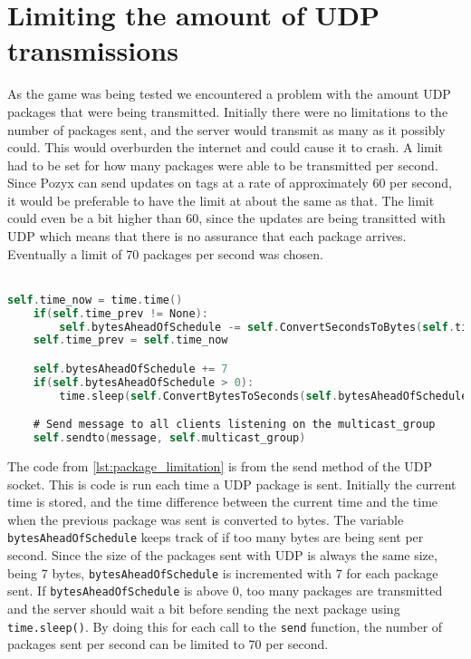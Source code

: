 \section{Limiting the amount of UDP transmissions}
As the game was being tested we encountered a problem with the amount UDP packages that were being transmitted.
Initially there were no limitations to the number of packages sent, and the server would transmit as many as it possibly could.
This would overburden the internet and could cause it to crash.
A limit had to be set for how many packages were able to be transmitted per second.
Since Pozyx can send updates on tags at a rate of approximately 60 per second, it would be preferable to have the limit at about the same as that.
The limit could even be a bit higher than 60, since the updates are being transitted with UDP which means that there is no assurance that each package arrives.
Eventually a limit of 70 packages per second was chosen.
\\\\
\begin{lstlisting}[caption={Implementaion of the limit on the amount of packages that can be sent per second}, captionpos=b,language=C,label={lst:package_limitation}]
    self.time_now = time.time()
    if(self.time_prev != None):
        self.bytesAheadOfSchedule -= self.ConvertSecondsToBytes(self.time_now - self.time_prev)
    self.time_prev = self.time_now

    self.bytesAheadOfSchedule += 7
    if(self.bytesAheadOfSchedule > 0):
        time.sleep(self.ConvertBytesToSeconds(self.bytesAheadOfSchedule))

    # Send message to all clients listening on the multicast_group
    self.sendto(message, self.multicast_group)
\end{lstlisting}
The code from \autoref{lst:package_limitation} is from the send method of the UDP socket.
This is code is run each time a UDP package is sent.
Initially the current time is stored, and the time difference between the current time and the time when the previous package was sent is converted to bytes.
The variable \texttt{bytesAheadOfSchedule} keeps track of if too many bytes are being sent per second.
Since the size of the packages sent with UDP is always the same size, being 7 bytes, \texttt{bytesAheadOfSchedule} is incremented with 7 for each package sent.
If \texttt{bytesAheadOfSchedule} is above 0, too many packages are transmitted and the server should wait a bit before sending the next package using \texttt{time.sleep()}. By doing this for each call to the \texttt{send} function, the number of packages sent per second can be limited to 70 per second.
